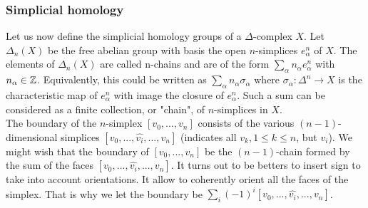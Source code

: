 \documentclass[12pt, a4paper]{article}
\begin{document}
\subsubsection{Simplicial homology}

Let us now define the simplicial homology groups of a $\Delta$-complex $X$. Let $\Delta_n(X)$ be the free abelian group with basis the open $n$-simplices $e^n_\alpha$ of $X$. The elements of $\Delta_n(X)$ are called n-chains and are of the form $\sum_\alpha n_\alpha e^n_\alpha$ with $n_\alpha \in \mathbb{Z}$. Equivalently, this could be written as $\sum_\alpha n_\alpha \sigma_\alpha$ where $\sigma_\alpha : \Delta^n \to X$ is the characteristic map of $e^n_\alpha$ with image the closure of $e^n_\alpha$. Such a sum can be considered as a finite collection, or "chain", of $n$-simplices in $X$.\\

The boundary of the $n$-simplex $[v_0, ..., v_n]$ consists of the various $(n-1)$-dimensional simplices $[v_0, ... , \hat{v_i} , ... , v_n]$ (indicates all $v_{k}, 1 \le k \le n$, but $v_i$). We might wish that the boundary of  $[v_0, ..., v_n]$ be the $(n-1)$-chain formed by the sum of the faces $[v_0, ... ,\hat{v_i} , ... , v_n]$. It turns out to be betters to insert sign to take into account orientations. It allow to coherently orient all the faces of the simplex. That is why we let the boundary be $\sum_i (-1)^i [v_0, ... , \hat{v_i} , ... , v_n]$.\\
\end{document}
